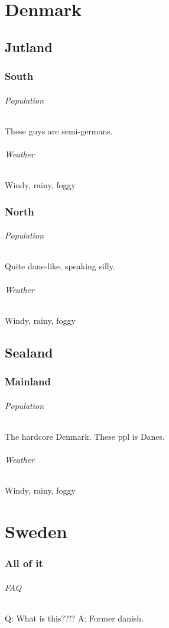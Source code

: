 \documentclass{book}
\begin{document}
\part{Denmark}
\chapter{Jutland}
\section{South}
\paragraph{Population}
These guys are semi-germans.
\paragraph{Weather}
Windy, rainy, foggy

\section{North}
\paragraph{Population}
Quite dane-like, speaking silly.
\paragraph{Weather}
Windy, rainy, foggy

\chapter{Sealand}
\section{Mainland}
\paragraph{Population}
The hardcore Denmark. These ppl is Danes.
\paragraph{Weather}
Windy, rainy, foggy

\part{Sweden}
\section{All of it}
\paragraph{FAQ}
Q: What is this??!?
A: Former danish.
\end{document}
